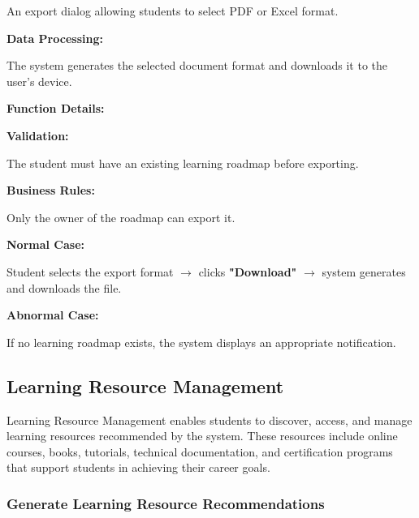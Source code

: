 An export dialog allowing students to select PDF or Excel format.

\vspace{0.2cm}

\textbf{Data Processing:}

The system generates the selected document format and downloads it to the user's device.

\vspace{0.3cm}

\textbf{Function Details:}

\textbf{Validation:}

The student must have an existing learning roadmap before exporting.

\textbf{Business Rules:}

Only the owner of the roadmap can export it.

\textbf{Normal Case:}

Student selects the export format $\rightarrow$ clicks \textbf{"Download"} $\rightarrow$ system generates and downloads the file.

\textbf{Abnormal Case:}

If no learning roadmap exists, the system displays an appropriate notification.

%

\subsection{Learning Resource Management}

Learning Resource Management enables students to discover, access, and manage learning resources recommended by the system. These resources include online courses, books, tutorials, technical documentation, and certification programs that support students in achieving their career goals.

\subsubsection{Generate Learning Resource Recommendations}

